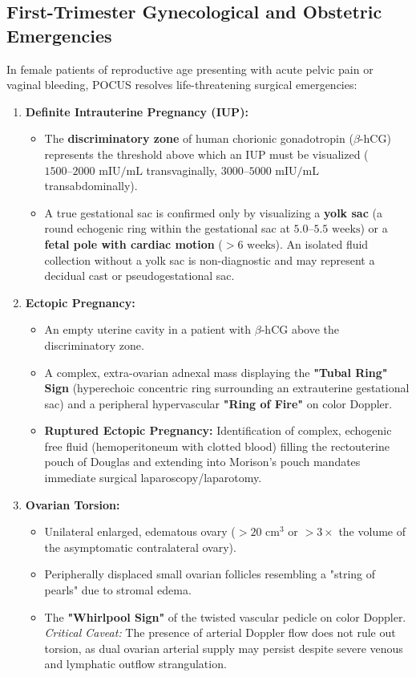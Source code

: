 \documentclass[11pt,a4paper]{article}
\begin{document}
\subsection{First-Trimester Gynecological and Obstetric Emergencies}
In female patients of reproductive age presenting with acute pelvic pain or vaginal bleeding, POCUS resolves life-threatening surgical emergencies:
\begin{enumerate}[leftmargin=2em]
    \item \textbf{Definite Intrauterine Pregnancy (IUP):}
    \begin{itemize}
        \item The \textbf{discriminatory zone} of human chorionic gonadotropin ($\beta\text{-hCG}$) represents the threshold above which an IUP must be visualized ($1500\text{--}2000\text{ mIU/mL}$ transvaginally, $3000\text{--}5000\text{ mIU/mL}$ transabdominally).
        \item A true gestational sac is confirmed only by visualizing a \textbf{yolk sac} (a round echogenic ring within the gestational sac at $5.0\text{--}5.5\text{ weeks}$) or a \textbf{fetal pole with cardiac motion} ($> 6\text{ weeks}$). An isolated fluid collection without a yolk sac is non-diagnostic and may represent a decidual cast or pseudogestational sac.
    \end{itemize}
    \item \textbf{Ectopic Pregnancy:}
    \begin{itemize}
        \item An empty uterine cavity in a patient with $\beta\text{-hCG}$ above the discriminatory zone.
        \item A complex, extra-ovarian adnexal mass displaying the \textbf{"Tubal Ring" Sign} (hyperechoic concentric ring surrounding an extrauterine gestational sac) and a peripheral hypervascular \textbf{"Ring of Fire"} on color Doppler.
        \item \textbf{Ruptured Ectopic Pregnancy:} Identification of complex, echogenic free fluid (hemoperitoneum with clotted blood) filling the rectouterine pouch of Douglas and extending into Morison's pouch mandates immediate surgical laparoscopy/laparotomy.
    \end{itemize}
    \item \textbf{Ovarian Torsion:}
    \begin{itemize}
        \item Unilateral enlarged, edematous ovary ($> 20\text{ cm}^3$ or $> 3\times$ the volume of the asymptomatic contralateral ovary).
        \item Peripherally displaced small ovarian follicles resembling a "string of pearls" due to stromal edema.
        \item The \textbf{"Whirlpool Sign"} of the twisted vascular pedicle on color Doppler. \textit{Critical Caveat:} The presence of arterial Doppler flow does not rule out torsion, as dual ovarian arterial supply may persist despite severe venous and lymphatic outflow strangulation.
    \end{itemize}
\end{enumerate}
\end{document}
